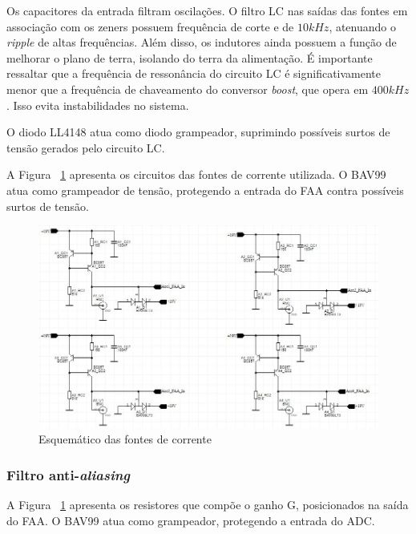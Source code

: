 \documentclass[
	12pt,				%
	openright,			%
	twoside,			%
	a4paper,			%
	english,			%
	french,				%
	spanish,			%
	brazil,				%
	]{abntex2}
\begin{document}
				Os capacitores da entrada filtram oscilações. O filtro LC
				nas saídas das fontes em associação com os zeners possuem
				frequência de corte e de $10kHz$, atenuando o
				\textit{ripple} de altas frequências. Além disso, os
				indutores ainda possuem a função de melhorar o plano de
				terra, isolando do terra da alimentação. É importante
				ressaltar que a frequência de ressonância do circuito LC é
				significativamente menor que a frequência de chaveamento do
				conversor \textit{boost}, que opera em $400kHz$. Isso evita
				instabilidades no sistema.

				O diodo LL4148 atua como diodo grampeador, suprimindo
				possíveis surtos de tensão gerados pelo circuito LC.

				A Figura ~\ref{fig:esquematicoFontesCorrente} apresenta os circuitos das fontes de corrente
				utilizada. O BAV99 atua como grampeador de tensão,
				protegendo a entrada do FAA contra possíveis surtos de
				tensão.

				\begin{figure}[!ht]
					\centering
					\includegraphics[width=\linewidth]{../Fotos/fonteCorrenteEsquematico.jpg}
					\caption{Esquemático das fontes de corrente}
					\label{fig:esquematicoFontesCorrente}
				\end{figure}				

			\subsubsection{Filtro anti-\textit{aliasing}}

				A Figura ~\ref{fig:esquematicoFontesCorrente} apresenta os resistores que compõe o ganho G,
				posicionados na saída do FAA. O BAV99 atua como grampeador,
				protegendo a entrada do ADC.
\end{document}
